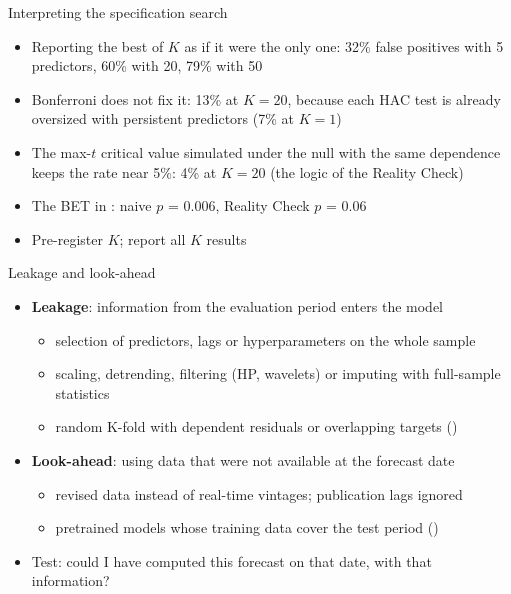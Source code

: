 \begin{frame}{Interpreting the specification search}
\itemsize{\small}
\begin{itemize}
    \item Reporting the best of $K$ as if it were the only one: 32\% false positives with 5 predictors, 60\% with 20, 79\% with 50
    \item Bonferroni does not fix it: 13\% at $K = 20$, because each HAC test is already oversized with persistent predictors (7\% at $K = 1$)
    \item The max-$t$ critical value simulated under the null with the same dependence keeps the rate near 5\%: 4\% at $K = 20$ (the logic of the Reality Check)
    \item The BET in : naive $p$ = 0.006, Reality Check $p$ = 0.06
    \item Pre-register $K$; report all $K$ results
\end{itemize}
\end{frame}

\begin{frame}{Leakage and look-ahead}
\itemsize{\small}
\begin{itemize}
    \item \textbf{Leakage}: information from the evaluation period enters the model 
    \begin{itemize}
        \item selection of predictors, lags or hyperparameters on the whole sample
        \item scaling, detrending, filtering (HP, wavelets) or imputing with full-sample statistics
        \item random K-fold with dependent residuals or overlapping targets ()
    \end{itemize}
    \item \textbf{Look-ahead}: using data that were not available at the forecast date
    \begin{itemize}
        \item revised data instead of real-time vintages; publication lags ignored
        \item pretrained models whose training data cover the test period ()
    \end{itemize}
    \item Test: could I have computed this forecast on that date, with that information?
\end{itemize}
\end{frame}


